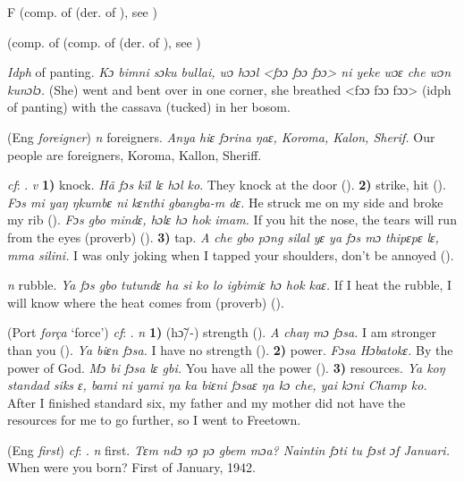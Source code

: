 \begin{letter}{F}
 (comp. of  (der. of ), see )

 (comp. of  (comp. of  (der. of ), see )

 \textit{Idph} of panting. \textit{Kɔ bimni sɔku bullai, wɔ hɔɔl <fɔɔ fɔɔ fɔɔ> ni yeke wɔɛ che wɔn kunɔlɔ.} (She) went and bent over in one corner, she breathed <fɔɔ fɔɔ fɔɔ> (idph of panting) with the cassava (tucked) in her bosom.

 (Eng \textit{foreigner}) \textit{n} foreigners. \textit{Anya hiɛ fɔrina ŋaɛ, Koroma, Kalon, Sherif.} Our people are foreigners, Koroma, Kallon, Sheriff.

 \textit{cf}: . \textit{v} \textbf{1)} knock. \textit{Hã fɔs kïl lɛ hɔl ko}. They knock at the door (\citealt{Pichl1967}). \textbf{2)} strike, hit (\citealt{Sumner1921}). \textit{Fɔs mi yaŋ ŋkumbɛ ni kɛnthi gbangba-m dɛ.} He struck me on my side and broke my rib (\citealt{Pichl1967}). \textit{Fɔs gbo mindɛ, hɔlɛ hɔ hok imam.} If you hit the nose, the tears will run from the eyes (proverb) (\citealt{TISLL1979}). \textbf{3)} tap. \textit{A che gbo pɔng silal yɛ ya fɔs mɔ thipɛpɛ lɛ, mma silini.} I was only joking when I tapped your shoulders, don't be annoyed (\citealt{Pichl1967}). 

 \textit{n} rubble. \textit{Ya fɔs gbo tutundɛ ha si ko lo igbimiɛ hɔ hok kaɛ.} If I heat the rubble, I will know where the heat comes from (proverb) (\citealt{TISLL1979}).

 (Port \textit{força} ‘force') \textit{cf}: . \textit{n} \textbf{1)} (hɔ̃/-) strength (\citealt{Pichl1967}). \textit{A chaŋ mɔ fɔsa.} I am stronger than you (\citealt{Pichl1967}). \textit{Ya biɛn fɔsa.} I have no strength (\citealt{Pichl1967}). \textbf{2)} power. \textit{Fɔsa Hɔbatokɛ.} By the power of God. \textit{Mɔ bi fɔsa lɛ gbi.} You have all the power (\citealt{Pichl1967}). \textbf{3)} resources. \textit{Ya koŋ standad siks ɛ, bami ni yami ŋa ka biɛni fɔsaɛ ŋa kɔ che, yai kɔni Champ ko.} After I finished standard six, my father and my mother did not have the resources for me to go further, so I went to Freetown.

 (Eng \textit{first}) \textit{cf}: . \textit{n} first. \textit{Tɛm ndɔ ŋɔ pɔ gbem mɔa? Naintin fɔti tu fɔst ɔf Januari.} When were you born? First of January, 1942.


\end{letter}
